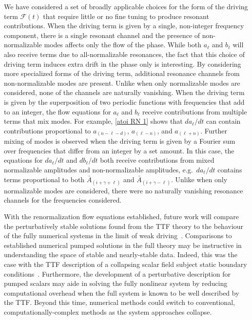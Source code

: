 \documentclass[letterpaper,11pt]{article}
\newcommand{\mc}{\mathcal}
\begin{document}
We have considered a set of broadly applicable choices for the form of the driving term $\mc F(t)$ that require little or no fine tuning to produce resonant contributions. When the driving term is given by a single, non-integer frequency component, there is a single resonant channel and the presence of non-normalizable modes affects only the flow of the phase. While both $a_\ell$ and $b_\ell$ will also receive terms due to all-normalizable resonances, the fact that this choice of driving term induces extra drift in the phase only is interesting. By considering more specialized forms of the driving term, additional resonance channels from non-normalizable modes are present. Unlike when only normalizable modes are considered, none of the channels are naturally vanishing. When the driving term is given by the superposition of two periodic functions with frequencies that add to an integer, the flow equations for $a_\ell$ and $b_\ell$ receive contributions from multiple terms that mix modes. For example, \eqref{atoi RN 1} shows that $da_\ell / dt$ can contain contributions proportional to $a_{(n-\ell-d)}$, $a_{(\ell -n)}$, and $a_{(\ell + n)}$. Further mixing of modes is observed when the driving term is given by a Fourier sum over frequencies that differ from an integer by a set amount. In this case, the equations for $da_\ell / dt$ and $db_\ell / dt$ both receive contributions from mixed normalizable amplitudes and non-normalizable amplitudes, e.g.~$da_\ell / dt$ contains terms proportional to both ${\bar A_{(i + \gamma +\ell)}}$ and ${\bar A_{(i + \gamma - \ell)}}$. Unlike when only normalizable modes are considered, there were no naturally vanishing resonance channels for the frequencies considered.

With the renormalization flow equations established, future work will compare the perturbatively stable solutions found from the TTF theory to the behaviour of the fully numerical systems in the limit of weak driving~\cite{1712.07637, 1502.05726}. Comparisons to established numerical pumped solutions in the full theory may be instructive in understanding the space of stable and nearly-stable data. Indeed, this was the case with the TTF description of a collapsing scalar field subject static boundary conditions~\cite{1507.08261}. Furthermore, the development of a perturbative description for pumped scalars may aide in solving the fully nonlinear system by reducing computational overhead when the full system is known to be well described by the TTF. Beyond this time, numerical methods could switch to conventional, computationally-complex methods as the system approaches collapse.
\end{document}
